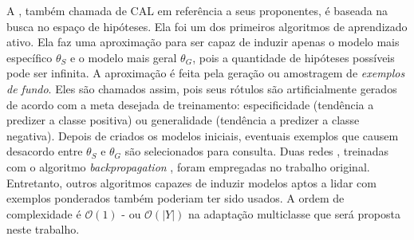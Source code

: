 A  \cite{journals/ml/CohnAL94}, também chamada de CAL \cite{journals/tcs/Dasgupta11} em referência a seus proponentes,
é baseada na busca no espaço de hipóteses.
Ela foi um dos primeiros algoritmos de aprendizado ativo.
Ela faz uma aproximação para ser capaz de induzir apenas o modelo mais específico $\theta_S$ e o modelo mais geral $\theta_G$, pois a quantidade de hipóteses possíveis pode ser infinita.
A aproximação é feita pela geração ou amostragem de \textit{exemplos de fundo}.
Eles são chamados assim, pois seus rótulos são artificialmente gerados de acordo com a meta desejada de treinamento: especificidade (tendência a predizer a classe positiva) ou generalidade (tendência a predizer a classe negativa).
Depois de criados os modelos iniciais, eventuais exemplos que causem desacordo entre $\theta_S$ e $\theta_G$ são selecionados para consulta.
Duas redes , treinadas com o algoritmo \textit{backpropagation} \cite{haykin2004comprehensive}, foram empregadas no trabalho original.
Entretanto, outros algoritmos capazes de induzir modelos aptos a lidar com exemplos ponderados também poderiam ter sido usados.
A ordem de complexidade é $\mathcal{O}(1)$ - ou $\mathcal{O}(|Y|)$ na adaptação multiclasse que será proposta neste trabalho.


